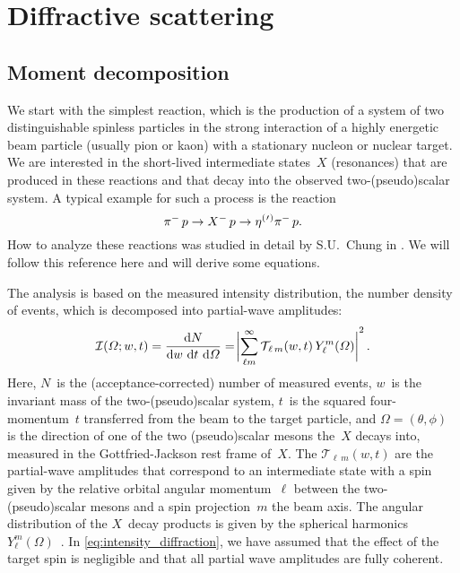 \section{Diffractive scattering}%
\label{sec:diffraction}

\subsection{Moment decomposition}%
\label{sec:diffraction:moment}

We start with the simplest reaction, which is the production of a
system of two distinguishable spinless particles in the strong
interaction of a highly energetic beam particle (usually pion or kaon)
with a stationary nucleon or nuclear target.  We are interested in the
short-lived intermediate states~$X$ (resonances) that are produced in
these reactions and that decay into the observed two-(pseudo)scalar
system.  A typical example for such a process is the reaction
\begin{equation}
  \pi^-\, p \to X^-\, p \to \etaOrPrPim\, p.
\end{equation}
How to analyze these reactions was studied in detail by S.U.~Chung in
.  We will follow this reference here and will
derive some equations.

The analysis is based on the measured intensity distribution, \ie the
number density of events, which is decomposed into partial-wave
amplitudes:
\begin{equation}
  \label{eq:intensity_diffraction}
  \mathcal{I}(\Omega; w, t)
  = \frac{\dif{N}}{\dif{w}\, \dif{t}\, \dif{\Omega}}
  = \Abs[3]{\sum_{\ell m}^\infty \mathcal{T\!}_{\ell\, m}(w, t)\, Y_\ell^m(\Omega)}^2.
\end{equation}
Here, $N$~is the (acceptance-corrected) number of measured events,
$w$~is the invariant mass of the two-(pseudo)scalar system, $t$~is the
squared four-momentum~$t$ transferred from the beam to the target
particle, and $\Omega = (\theta, \phi)$ is the direction of one of the
two (pseudo)scalar mesons the~$X$ decays into, measured in the
Gottfried-Jackson rest frame of~$X$.  The $\mathcal{T\!}_{\ell\, m}(w, t)$
are the partial-wave amplitudes that correspond to an intermediate
state with a spin given by the relative orbital angular
momentum~$\ell$ between the two-(pseudo)scalar mesons and a spin
projection~$m$ \wrt the beam axis.  The angular distribution of the
$X$~decay products is given by the spherical harmonics
$Y_\ell^m(\Omega)$~\cite{wikipedia:sphericalHarm}.  In
\cref{eq:intensity_diffraction}, we have assumed that the effect of
the target spin is negligible and that all partial wave amplitudes are
fully coherent.


